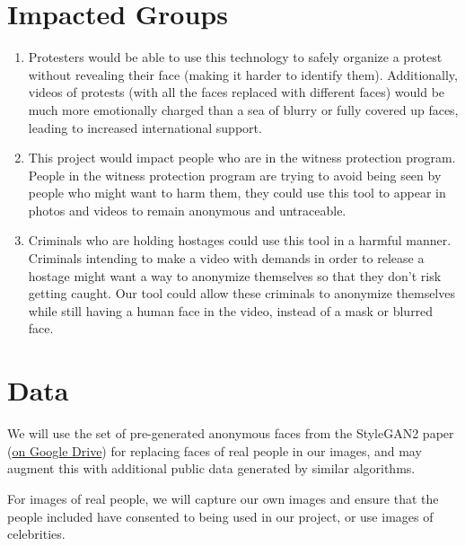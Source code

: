 \section*{Impacted Groups}


\begin{enumerate}
    \item Protesters would be able to use this technology to safely organize a protest without revealing their face (making it harder to identify them). Additionally, videos of protests (with all the faces replaced with different faces) would be much more emotionally charged than a sea of blurry or fully covered up faces, leading to increased international support.

    \item This project would impact people who are in the witness protection program. People in the witness protection program are trying to avoid being seen by people who might want to harm them, they could use this tool to appear in photos and videos to remain anonymous and untraceable.

    \item Criminals who are holding hostages could use this tool in a harmful manner. Criminals intending to make a video with demands in order to release a hostage might want a way to anonymize themselves so that they don't risk getting caught. Our tool could allow these criminals to anonymize themselves while still having a human face in the video, instead of a mask or blurred face.

\end{enumerate}

\section*{Data}


We will use the set of pre-generated anonymous faces from the StyleGAN2 paper (\href{https://drive.google.com/drive/folders/1-0YhtXe_oE2ei0R471X33a_NJyY5dVge}{on Google Drive}) for replacing faces of real people in our images, and may augment this with additional public data generated by similar algorithms.

For images of real people, we will capture our own images and ensure that the people included have consented to being used in our project, or use images of celebrities.

